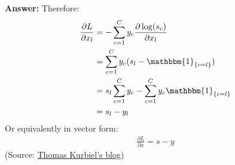 \documentclass{article}
\newenvironment{QandA}{\begin{enumerate}[label=\arabic*.]}{\end{enumerate}}
\newenvironment{answer}{\par\normalfont \textbf{Answer:}}{}
\newcommand{\Indicator}[1]{\mathbbm{1}_{\left\{ #1 \right\}}}
\begin{document}
\begin{QandA}
\begin{answer}
        Therefore:
        \begin{align*}
            \frac{\partial L}{\partial x_l} &= - \sum_{c=1}^C y_c  \frac{\partial \log (s_c)}{\partial x_l}  \\
            &= \sum_{c=1}^C y_c (s_l - \Indicator{c = l}) \\
            &= s_l \sum_{c=1}^C y_c - \sum_{c=1}^C y_c \Indicator{c = l} \\
            &= s_l - y_l
        \end{align*}
        Or equivalently in vector form:
        \begin{align*}
            \frac{\partial L}{\partial x} = s - y 
        \end{align*}
    (Source:  \href{https://towardsdatascience.com/derivative-of-the-softmax-function-and-the-categorical-cross-entropy-loss-ffceefc081d1}{Thomas Kurbiel's blog})  \end{answer}


\end{QandA}
\end{document}
